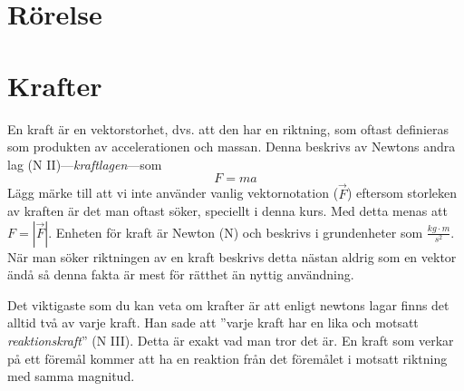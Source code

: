 \documentclass[12pt, a4paper]{article}
\theoremstyle{definition}
\begin{document}
    \part{Rörelse}
    

    \part{Krafter}
    En kraft är en vektorstorhet, dvs. att den har en riktning, som oftast definieras som produkten av accelerationen och massan. Denna beskrivs av Newtons andra lag (N II)---\emph{kraftlagen}---som
    \begin{equation*}
        F=ma
    \end{equation*}
    Lägg märke till att vi inte använder vanlig vektornotation ($\vec{F}$) eftersom storleken av kraften är det man oftast söker, speciellt i denna kurs. Med detta menas att $F = |\vec{F}|$. Enheten för kraft är Newton (N) och beskrivs i grundenheter som $\frac{kg \cdot m}{s^2}$. När man söker riktningen av en kraft beskrivs detta nästan aldrig som en vektor ändå så denna fakta är mest för rätthet än nyttig användning.

    Det viktigaste som du kan veta om krafter är att enligt newtons lagar finns det alltid två av varje kraft. Han sade att ''varje kraft har en lika och motsatt \emph{reaktionskraft}'' (N III). Detta är exakt vad man tror det är. En kraft som verkar på ett föremål kommer att ha en reaktion från det föremålet i motsatt riktning med samma magnitud.
\end{document}
